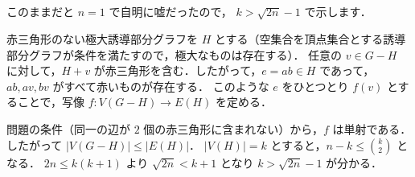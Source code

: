 \subsection{}
このままだと $n=1$ で自明に嘘だったので， $k> \sqrt{2n} - 1$ で示します．

赤三角形のない極大誘導部分グラフを $H$ とする（空集合を頂点集合とする誘導部分グラフが条件を満たすので，極大なものは存在する）．
任意の $v\in G-H$ に対して，$H+v$ が赤三角形を含む．したがって，$e=ab\in H$ であって，$ab, av, bv$ がすべて赤いものが存在する．
このような $e$ をひとつとり $f(v)$ とすることで，写像 $f\colon V(G-H) \longrightarrow E(H)$ を定める．

問題の条件（同一の辺が $2$ 個の赤三角形に含まれない）から，$f$ は単射である．したがって $|V(G-H)| \leq |E(H)|$．
$|V(H)| = k$ とすると，$n - k\leq \binom{k}{2}$ となる．
$2n \leq k(k+1)$ より $\sqrt{2n} < k+1$ となり $k > \sqrt{2n} - 1$ が分かる．
